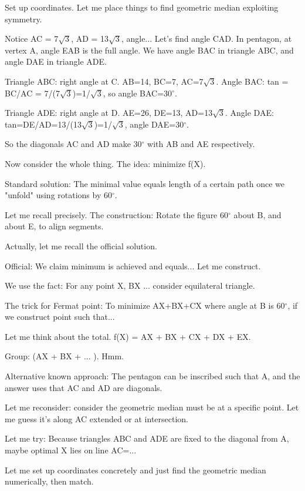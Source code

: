 \begin{decodedreasoningpanel}
Set up coordinates. Let me place things to find geometric median exploiting symmetry.

Notice AC = 7\ensuremath{\sqrt{3}}, AD = 13\ensuremath{\sqrt{3}}, angle... Let's find angle CAD. In pentagon, at vertex A, angle EAB is the full angle. We have angle BAC in triangle ABC, and angle DAE in triangle ADE.

Triangle ABC: right angle at C. AB=14, BC=7, AC=7\ensuremath{\sqrt{3}}. Angle BAC: tan = BC/AC = 7/(7\ensuremath{\sqrt{3}})=1/\ensuremath{\sqrt{3}}, so angle BAC=30\ensuremath{^\circ}.

Triangle ADE: right angle at D. AE=26, DE=13, AD=13\ensuremath{\sqrt{3}}. Angle DAE: tan=DE/AD=13/(13\ensuremath{\sqrt{3}})=1/\ensuremath{\sqrt{3}}, angle DAE=30\ensuremath{^\circ}.

So the diagonals AC and AD make 30\ensuremath{^\circ} with AB and AE respectively.

Now consider the whole thing. The idea: minimize f(X). 

Standard solution: The minimal value equals length of a certain path once we "unfold" using rotations by 60\ensuremath{^\circ}.

Let me recall precisely. The construction: Rotate the figure 60\ensuremath{^\circ} about B, and about E, to align segments.

Actually, let me recall the official solution.

Official: We claim minimum is achieved and equals... Let me construct.

We use the fact: For any point X, BX ... consider equilateral triangle.

The trick for Fermat point: To minimize AX+BX+CX where angle at B is 60\ensuremath{^\circ}, if we construct point such that...

Let me think about the total. f(X) = AX + BX + CX + DX + EX.

Group: (AX + BX + ... ). Hmm.

Alternative known approach: The pentagon can be inscribed such that A, and the answer uses that AC and AD are diagonals.

Let me reconsider: consider the geometric median must be at a specific point. Let me guess it's along AC extended or at intersection.

Let me try: Because triangles ABC and ADE are fixed to the diagonal from A, maybe optimal X lies on line AC=... 

Let me set up coordinates concretely and just find the geometric median numerically, then match.


\end{decodedreasoningpanel}

